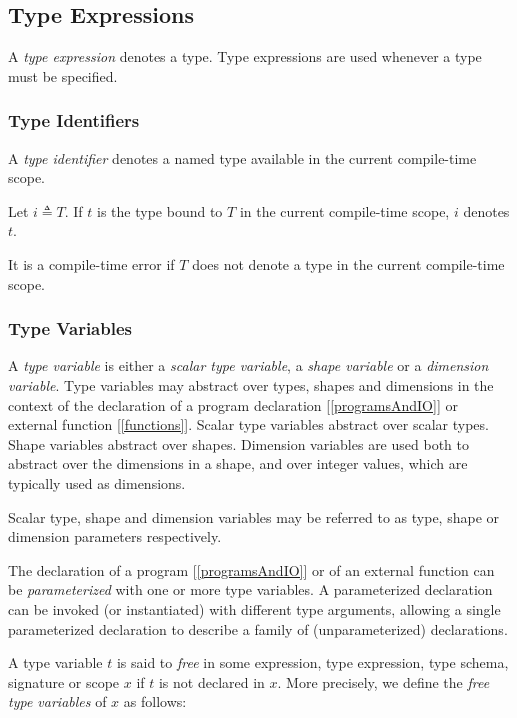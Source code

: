 \documentclass{article}
\begin{document}
\subsection{Type Expressions}
\label{typeExpressions}

A {\em type expression} denotes a type. Type expressions are used whenever a type must be specified.


\subsubsection{Type Identifiers}
\label{typeIdentifiers}

A {\em type identifier} denotes a named type available in the current compile-time scope.

Let $i \triangleq T$. If $t$ is the type bound to $T$ in the current compile-time scope, $i$ denotes $t$. 

It is a compile-time error if $T$ does not denote a type in the current compile-time scope.

\subsubsection{Type Variables}
\label{typeVariables}

A {\em type variable} is either a {\em scalar type variable}, a {\em shape variable} or a {\em dimension variable}. Type variables may abstract over types, shapes and dimensions in the context of the declaration of a program declaration [\ref{programsAndIO}] or external function [\ref{functions}]. Scalar type variables abstract over  scalar types. Shape variables abstract over shapes. Dimension variables are used both to abstract over the dimensions in a shape, and over integer values, which are typically used as dimensions.

Scalar type, shape and dimension variables may be referred to as type, shape or dimension parameters respectively.

 The declaration of a program [\ref{programsAndIO}] or of an external function can be {\em parameterized} with one or more type variables. A parameterized declaration can be invoked (or instantiated) with different type arguments, allowing a single parameterized declaration to describe a family of (unparameterized) declarations. 
 
 A type variable $t$ is said to {\em free} in some expression, type expression, type schema, signature or scope $x$ if $t$ is not declared in $x$.  More precisely, we define the {\em free type variables} of $x$ as follows:
 
\end{document}
